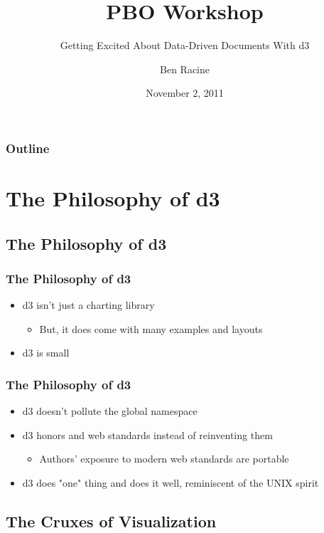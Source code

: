 \documentclass{beamer}
\title{PBO Workshop}
\subtitle{Getting Excited About Data-Driven Documents With d3}
\author{Ben Racine \inst{1} }
\institute{\inst{1} Cornerstone Systems NW }
\date{November 2, 2011}
\begin{document}
\begin{frame}
    \frametitle{}
    \titlepage
\end{frame}


 \begin{frame}
    \scriptsize{
        \frametitle{Outline}
        \tableofcontents[pausesections]
    }
 \end{frame}



\section{The Philosophy of d3}


\subsection{The Philosophy of d3}

\begin{frame}
\frametitle{The Philosophy of d3}
\begin{itemize}
\item d3 isn't just a charting library
    \begin{itemize}
    \item But, it does come with many examples and layouts
    \end{itemize}
\item d3 is small
\end{itemize}
\end{frame}


\begin{frame}
\frametitle{The Philosophy of d3}
\begin{itemize}
\item d3 doesn't pollute the global namespace
\item d3 honors and web standards instead of reinventing them
    \begin{itemize}
    \item Authors' exposure to modern web standards are portable
    \end{itemize}
\item d3 does "one" thing and does it well, reminiscent of the UNIX spirit
\end{itemize}
\end{frame}


\subsection{The Cruxes of Visualization}
\end{document}
